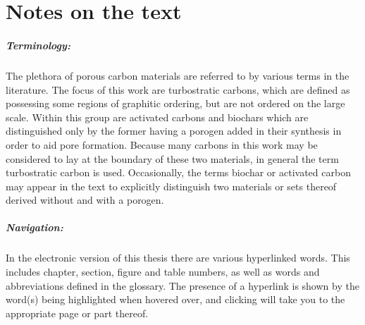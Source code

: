 \cleardoublepage
\chapter*{Notes on the text}

\paragraph{Terminology:} The plethora of porous carbon materials are referred to by various terms in the literature. The focus of this work are \glspl{turbostratic carbon}, which are defined as possessing some regions of graphitic ordering, but are not ordered on the large scale. Within this group are \glspl{activated carbon} and \glspl{biochar} which are distinguished only by the former having a \gls{porogen} added in their synthesis in order to aid pore formation. Because many carbons in this work may be considered to lay at the boundary of these two materials, in general the term \gls{turbostratic carbon} is used. Occasionally, the terms \gls{biochar} or \gls{activated carbon} may appear in the text to explicitly distinguish two materials or sets thereof derived without and with a \gls{porogen}.

\paragraph{Navigation:} In the electronic version of this thesis there are various hyperlinked words. This includes chapter, section, figure and table numbers, as well as words and abbreviations defined in the glossary. The presence of a hyperlink is shown by the word(s) being highlighted when hovered over, and clicking will take you to the appropriate page or part thereof. 